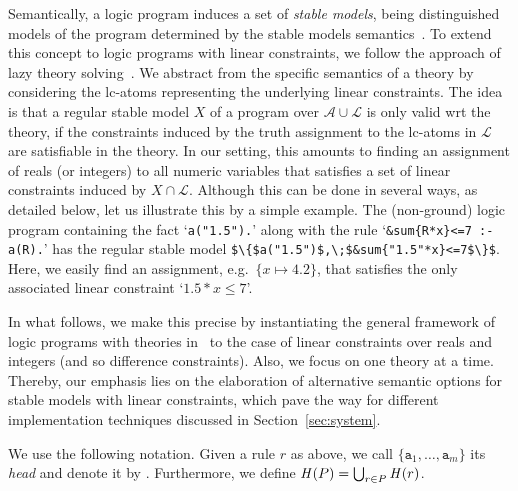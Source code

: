 Semantically, a logic program induces a set of \emph{stable models},
being distinguished models of the program determined by the stable models semantics~\cite{gellif91a}.
%
To extend this concept to logic programs with linear constraints,
we follow the approach of lazy theory solving~\cite{baseseti09a}.
We abstract from the specific semantics of a theory by considering the lc-atoms representing the underlying linear constraints.
The idea is that a regular stable model $X$ of a program over $\mathcal{A}\cup\mathcal{L}$ is only valid wrt the theory,
if the constraints induced by the truth assignment to the lc-atoms in $\mathcal{L}$ are satisfiable in the theory.
In our setting, 
this amounts to finding an assignment of reals (or integers) to all numeric variables that 
satisfies a set of linear constraints induced by $X\cap\mathcal{L}$.
%
Although this can be done in several ways, as detailed below,
let us illustrate this by a simple example.
The (non-ground) logic program containing the fact 
`\lstinline[mathescape]{a("1.5").}'
along with the rule
`\lstinline[mathescape]@&sum{R*x}<=7 :- a(R).@'
has the regular stable model \lstinline[mathescape]@$\{$a("1.5")$,\;$&sum{"1.5"*x}<=7$\}$@.
Here, we easily find an assignment, e.g.\ $\{x\mapsto 4.2\}$,
that satisfies the only associated linear constraint `$1.5*x\leq 7$'.

In what follows, we make this precise by instantiating 
the general framework of logic programs with theories in~\cite{gekakaosscwa16a}
to the case of linear constraints over reals and integers (and so difference constraints).
Also, we focus on one theory at a time.
%
Thereby,
our emphasis lies on the elaboration of alternative semantic options for stable models with linear constraints,
which pave the way for different implementation techniques discussed in Section~\ref{sec:system}.

We use the following notation.
Given a rule $r$ as above,
we call $\{\mathtt{a}_1,\dots,\mathtt{a}_m\}$ %
its \emph{head} %
and denote it %
by . %
Furthermore, we define
\(
\mathit{H}(P)=\bigcup_{r\in P}\mathit{H}(r)
\).

